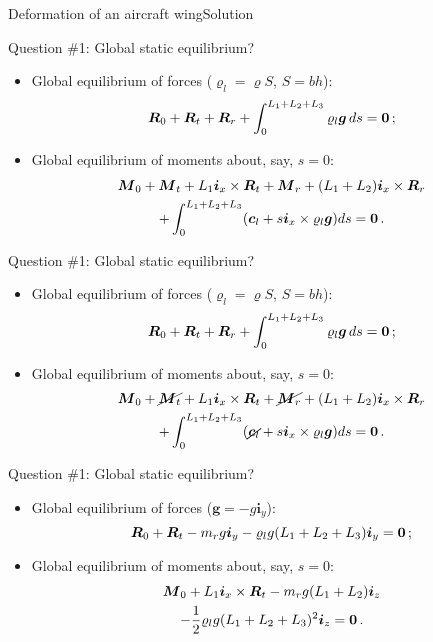 \documentclass{beamer}
\newcommand{\id}{d}
\newcommand{\demi}{\frac{1}{2}}
\newcommand{\cj}{c}
\newcommand{\cv}{{\boldsymbol\cj}}
\newcommand{\xj}{x}
\newcommand{\yj}{y}
\newcommand{\zj}{z}
\renewcommand{\ij}{i}
\newcommand{\iv}{{\boldsymbol\ij}}
\newcommand{\gj}{g}
\newcommand{\gv}{{\boldsymbol\gj}}
\newcommand{\roi}{\varrho}
\newcommand{\Fresj}{R}
\newcommand{\Mresj}{M}
\newcommand{\Fres}{{\boldsymbol\Fresj}}
\newcommand{\Mres}{{\boldsymbol\Mresj}}
\newcommand{\bzero}{{\bf 0}}
\begin{document}
\begin{frame}{Deformation of an aircraft wing}{Solution}

\begin{overprint}

\vskip-20pt
\begin{exampleblock}{Question \#1: Global static equilibrium?}
\begin{itemize}
\item Global equilibrium of forces ($\roi_l=\roi S$, $S=bh$):
\begin{displaymath}
\Fres_0+\Fres_t +\Fres_r +\int_0^{L_1+L_2+L_3}\roi_l\gv\,\id s =\bzero\,;
\end{displaymath}
\item Global equilibrium of moments about, say, $s=0$:
\begin{multline*}
\Mres_0 + \Mres_t + L_1\iv_\xj\times\Fres_t + \Mres_r + (L_1+L_2)\iv_\xj\times \Fres_r \\
+\int_0^{L_1+L_2+L_3}(\cv_l + s\iv_\xj\times\roi_l\gv) \id s=\bzero\,.
\end{multline*}
\end{itemize}
\end{exampleblock}

\vskip-20pt
\begin{exampleblock}{Question \#1: Global static equilibrium?}
\begin{itemize}
\item Global equilibrium of forces ($\roi_l=\roi S$, $S=bh$):
\begin{displaymath}
\Fres_0+\Fres_t +\Fres_r +\int_0^{L_1+L_2+L_3}\roi_l\gv\,\id s =\bzero\,;
\end{displaymath}
\item Global equilibrium of moments about, say, $s=0$:
\begin{multline*}
\Mres_0 + \cancel{\Mres_t }+ L_1\iv_\xj\times\Fres_t + \cancel{\Mres_r} + (L_1+L_2)\iv_\xj\times \Fres_r \\
+\int_0^{L_1+L_2+L_3}(\cancel{\cv_l} + s\iv_\xj\times\roi_l\gv) \id s=\bzero\,.
\end{multline*}
\end{itemize}
\end{exampleblock}

\vskip-20pt
\begin{exampleblock}{Question \#1: Global static equilibrium?}
\begin{itemize}
\item Global equilibrium of forces ($\gv=-g\iv_\yj$):
\begin{displaymath}
\Fres_0+\Fres_t -m_r g\iv_\yj -\roi_l g(L_1+L_2+L_3)\iv_\yj =\bzero\,;
\end{displaymath}
\item Global equilibrium of moments about, say, $s=0$:
\begin{multline*}
\Mres_0 + L_1\iv_\xj\times\Fres_t -m_r g (L_1+L_2)\iv_\zj \\
-\demi\roi_l g (L_1+L_2+L_3)^2\iv_\zj=\bzero\,.
\end{multline*}
\end{itemize}
\end{exampleblock}


\end{overprint}
\end{frame}
\end{document}
